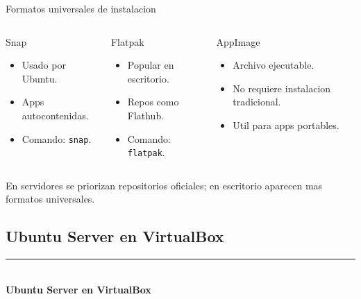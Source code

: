 \documentclass[aspectratio=169]{beamer}
\newcommand{\MainHeaderSlide}[2]{%
  \begin{frame}[plain]
    \hypertarget{#2}{}
    \vspace*{0.25\textheight}
    {\color{black}\rule{0.28\textwidth}{1.2pt}}\\[0.5em]
    {\usebeamerfont{title}\fontsize{34}{40}\selectfont\bfseries #1}
  \end{frame}
}
\begin{document}
\begin{frame}{Formatos universales de instalacion}
  \small
  \begin{columns}[t]
    \begin{block}{Snap}
      \begin{itemize}
        \item Usado por Ubuntu.
        \item Apps autocontenidas.
        \item Comando: \texttt{snap}.
      \end{itemize}
    \end{block}
    \begin{exampleblock}{Flatpak}
      \begin{itemize}
        \item Popular en escritorio.
        \item Repos como Flathub.
        \item Comando: \texttt{flatpak}.
      \end{itemize}
    \end{exampleblock}
    \begin{alertblock}{AppImage}
      \begin{itemize}
        \item Archivo ejecutable.
        \item No requiere instalacion tradicional.
        \item Util para apps portables.
      \end{itemize}
    \end{alertblock}
  \end{columns}
  \vfill
  \centering
  \small En servidores se priorizan repositorios oficiales; en escritorio aparecen mas formatos universales.
\end{frame}

\subsection{Ubuntu Server en VirtualBox}
\MainHeaderSlide{Ubuntu Server en VirtualBox}{idx-ubuntu-virtualbox}
\end{document}

